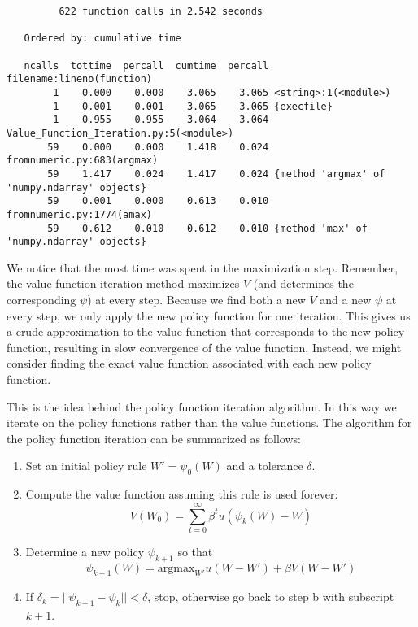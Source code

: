 \begin{lstlisting}[style=python]
%run -p -s cum Value_Function_Iteration.py
         622 function calls in 2.542 seconds
         
   Ordered by: cumulative time

   ncalls  tottime  percall  cumtime  percall filename:lineno(function)
        1    0.000    0.000    3.065    3.065 <string>:1(<module>)
        1    0.001    0.001    3.065    3.065 {execfile}
        1    0.955    0.955    3.064    3.064 Value_Function_Iteration.py:5(<module>)
       59    0.000    0.000    1.418    0.024 fromnumeric.py:683(argmax)
       59    1.417    0.024    1.417    0.024 {method 'argmax' of 'numpy.ndarray' objects}
       59    0.001    0.000    0.613    0.010 fromnumeric.py:1774(amax)
       59    0.612    0.010    0.612    0.010 {method 'max' of 'numpy.ndarray' objects}
\end{lstlisting}

We notice that the most time was spent in the maximization step.  Remember, the value function iteration method maximizes $V$ (and determines the corresponding $\psi$) at every step.  Because we find both a new $V$ and a new $\psi$ at every step, we only apply the new policy function for one iteration.  This gives us a crude approximation to the value function that corresponds to the new policy function, resulting in slow convergence of the value function.  Instead, we might consider finding the exact value function associated with each new policy function.  

This is the idea behind the policy function iteration algorithm.  In this way we iterate on the policy functions rather than the value functions.  The algorithm for the policy function iteration can be summarized as follows:

\begin{enumerate}
	\item Set an initial policy rule $W' = \psi_0(W)$ and a tolerance $\delta$.
	
	\item Compute the value function assuming this rule is used forever:
\begin{equation}
V(W_0) = \sum_{t=0}^\infty \beta^t u(\psi_k(W)-W)
\end{equation}


	\item Determine a new policy $\psi_{k+1}$ so that
	\begin{equation}
		\psi_{k+1}(W) = \text{argmax}_{W'} u(W-W') + \beta V(W-W')
	\end{equation}
	
	\item If $\delta_k = ||\psi_{k+1} - \psi_k|| < \delta$, stop, otherwise go back to step b with subscript $k+1$.
\end{enumerate}

